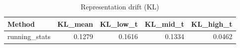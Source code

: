 \begin{table}[htbp]
\centering
\caption{Representation drift (KL)}
\label{tab:repr-drift}
\begin{tabular}{lrrrr}
\toprule
\textbf{Method} & \textbf{KL\_mean} & \textbf{KL\_low\_t} & \textbf{KL\_mid\_t} & \textbf{KL\_high\_t} \\
\midrule
running\_stats & 0.1279 & 0.1616 & 0.1334 & 0.0462 \\
\bottomrule
\end{tabular}
\end{table}